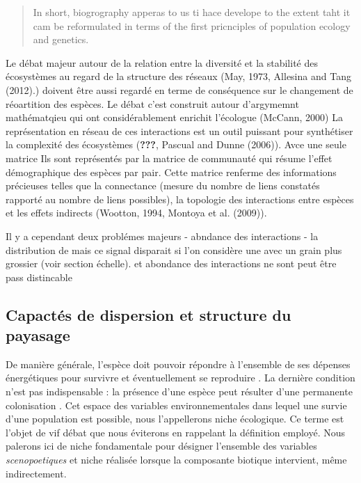 \begin{quote}
\guillemotleft In short, biogrography apperas to us ti hace develope to
the extent taht it cam be reformulated in terms of the first pricnciples
of population ecology and genetics. \guillemotright
\end{quote}

Le débat majeur autour de la relation entre la diversité et la stabilité
des écosystèmes au regard de la structure des réseaux (May, 1973,
Allesina and Tang (2012).) doivent être aussi regardé en terme de
conséquence sur le changement de réoartition des espèces. Le débat c'est
construit autour d'argymemnt mathématqieu qui ont considérablement
enrichit l'écologue (McCann, 2000) La représentation en réseau de ces
interactions est un outil puissant pour synthétiser la complexité des
écosystèmes ({\textbf{???}}, Pascual and Dunne (2006)). Avce une seule
matrice Ils sont représentés par la matrice de communauté qui résume
l'effet démographique des espèces par pair. Cette matrice renferme des
informations précieuses telles que la connectance (mesure du nombre de
liens constatés rapporté au nombre de liens possibles), la topologie des
interactions entre espèces \cite{Sole2006} et les effets indirects
(Wootton, 1994, Montoya et al. (2009)).

Il y a cependant deux problémes majeurs - abndance des interactions - la
distribution de mais ce signal disparait si l'on considère une avec un
grain plus grossier (voir section échelle). et abondance des
interactions ne sont peut être pass distincable

\subsection*{Capactés de dispersion et structure du
payasage}\label{capactuxe9s-de-dispersion-et-structure-du-payasage}

De manière générale, l'espèce doit pouvoir répondre à l'ensemble de ses
dépenses énergétiques pour survivre et éventuellement se reproduire
\cite{Holt2009a}. La dernière condition n'est pas indispensable : la
présence d'une espèce peut résulter d'une permanente colonisation
\cite{Leibold2004}. Cet espace des variables environnementales dans
lequel une survie d'une population est possible, nous l'appellerons
niche écologique. Ce terme est l'objet de vif débat \cite{Chase2003} que
nous éviterons en rappelant la définition employé. Nous palerons ici de
niche fondamentale pour désigner l'ensemble des variables
\textit{scenopoetiques} et niche réalisée lorsque la composante biotique
intervient, même indirectement.

